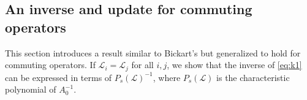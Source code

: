 \documentclass[review]{siamart}
\begin{document}
\subsection{An inverse and update for commuting operators}\label{sec:solve:inv}

This section introduces a result similar to Bickart's but generalized to hold for commuting
operators. If $\mathcal{L}_i=\mathcal{L}_j$ for all $i,j$, we show that the inverse of
\eqref{eq:k1} can be expressed in terms of $P_s(\mathcal{L})^{-1}$, where $P_s(\mathcal{L})$
is the characteristic polynomial of $A_0^{-1}$.
\end{document}
